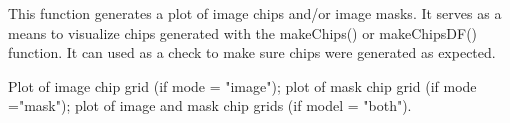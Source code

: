 \documentclass[a4paper]{book}
\begin{document}
%
\begin{Details}\relax
This function generates a plot of image chips and/or image masks. It serves
as a means to visualize chips generated with the makeChips() or makeChipsDF()
function. It can used as a check to make sure chips were generated as expected.
\end{Details}
%
\begin{Value}
Plot of image chip grid (if mode = "image"); plot of mask chip grid
(if mode ="mask"); plot of image and mask chip grids (if model = "both").
\end{Value}
\printindex{}
\end{document}

